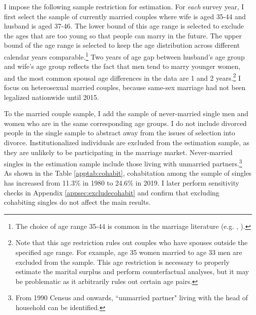    I impose the following sample restriction for estimation. For \textit{each} survey year, I first select the sample of currently married couples where wife is aged 35-44 and husband is aged 37-46. The lower bound of this age range is selected to exclude the ages that are too young so that people can marry in the future. The upper bound of the age range is selected to keep the age distribution across different calendar years comparable.\footnote{The choice of age range 35-44 is common in the marriage literature (e.g. \cite{CCDM_2020_AssortativeMatchingUS}, \cite{Bertrandetal_2021_SocialNorms}).} Two years of age gap between husband's age group and wife's age group reflects the fact that men tend to marry younger women, and the most common spousal age differences in the data are 1 and 2 years.\footnote{Note that this age restriction rules out couples who have spouses outside the specified age range. For example, age 35 women married to age 33 men are excluded from the sample. This age restriction is necessary to properly estimate the marital surplus and perform counterfactual analyses, but it may be problematic as it arbitrarily rules out certain age pairs.} I focus on heterosexual married couples, because same-sex marriage had not been legalized nationwide until 2015. 
   
   
   To the married couple sample, I add the sample of never-married single men and women who are in the same corresponding age groups. I do not include divorced people in the single sample to abstract away from the issues of selection into divorce. Institutionalized individuals are excluded from the estimation sample, as they are unlikely to be participating in the marriage market. Never-married singles in the estimation sample include those living with unmarried partners.\footnote{From 1990 Census and onwards, ``unmarried partner" living with the head of household can be identified.} As shown in the Table \ref{apptab:cohabit}, cohabitation among the sample of singles has increased from 11.3\% in 1980 to 24.6\% in 2019. I later perform sensitivity checks in Appendix \ref{appsec:excludecohabit} and confirm that excluding cohabiting singles do not affect the main results.  


